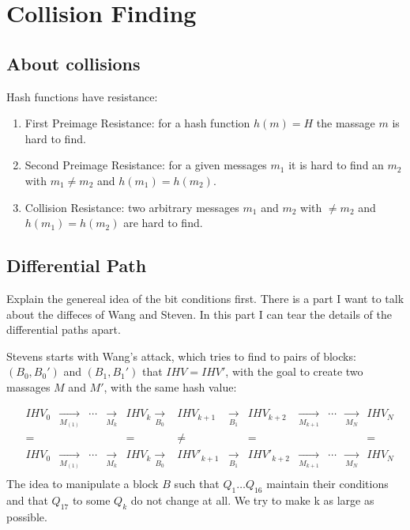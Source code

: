 \chapter{ Collision Finding}
\label{chapter:kap3}
\section {About collisions }
Hash functions have resistance:
\begin{enumerate}
    \item First Preimage Resistance: for a hash function $h(m) = H$ the massage $m$ is hard to find.       
    \item Second Preimage Resistance: for a given messages $m_1$ it is hard to find an $m_2$ with $m_1 \neq m_2 $ and $h(m_1) = h(m_2)$.
    \item Collision Resistance: two arbitrary messages  $m_1$ and $m_2$ with $\neq m_2 $ and  $h(m_1) = h(m_2)$ are hard to find.
\end{enumerate}


\section{Differential Path}
Explain the genereal idea of the bit conditions first. There is a part I want to talk about the diffeces of Wang and Steven. In this part I can tear the details of the differential paths apart.


Stevens starts with Wang's attack, which tries to find to pairs of blocks:
\( \left(B_0 , B_0' \right) \)  and \( \left(B_1 , B_1' \right) \) that \( IHV = IHV' \),
 with the goal to create two massages $ M $ and $ M' $, with the same hash value:

\begin{align*}
    &IHV_0 &\xrightarrow[M_{(1)}] {}&\cdots &\xrightarrow[M_k]{} &IHV_k \xrightarrow[B_0]{} &IHV_{k + 1}  &\xrightarrow[B_1]{} &IHV_{k + 2}  &\xrightarrow[M_{k+1}]{}&\cdots &\xrightarrow[M_N]{} &IHV_N\\
    &=     &                        &       &                    &=                         &\ne          &                    &=            &                       &       &                    &= \\
    &IHV_0 &\xrightarrow[M_{(1)}] {}&\cdots &\xrightarrow[M_k]{} &IHV_k \xrightarrow[B_0]{} &IHV'_{k + 1} &\xrightarrow[B_1]{} &IHV'_{k + 2} &\xrightarrow[M_{k+1}]{}&\cdots &\xrightarrow[M_N]{} &IHV_N\\
\end{align*} 
The idea to manipulate a block $B$ such that $Q_1 \dots Q_{16}$ maintain their conditions and that $Q_17$ to some $Q_k$ do not change at all. We try to make k as large as possible.
